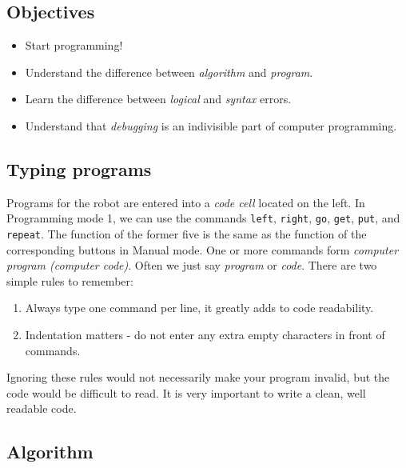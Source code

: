 \subsection{Objectives} 
 
\begin{itemize}
\item Start programming!
\item Understand the difference between {\em algorithm} and {\em program}. 
\item Learn the difference between {\em logical} and {\em syntax} errors.
\item Understand that {\em debugging} is an indivisible part of computer programming.
\end{itemize}

\subsection{Typing programs}

Programs for the robot are entered into a {\em code cell} located on the left.
In Programming mode 1, we can use the commands {\tt left}, {\tt right}, {\tt go}, {\tt get}, 
{\tt put}, and {\tt repeat}.
The function of the former five is the same as the function of the corresponding buttons 
in Manual mode. One or more commands form {\em computer program (computer code)}. Often 
we just say {\em program} or {\em code}. There are two simple rules to remember:\\

\begin{gbox}
\begin{enumerate}
\item Always type one command per line, it greatly adds to code readability.
\item Indentation matters - do not enter any extra empty characters in front of commands. 
\end{enumerate}
\end{gbox}
\vspace{6mm}

\noindent
Ignoring these rules would not necessarily make your program invalid, 
but the code would be difficult to read. It is very important to write 
a clean, well readable code. 

\subsection{Algorithm} \label{subsec:interm1}

